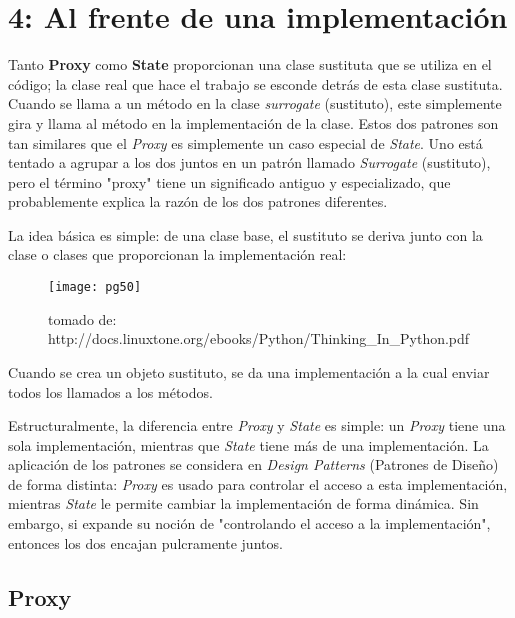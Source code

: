 \section*{4: Al frente de una implementación}
\label{sec:afdui}

Tanto \textbf{Proxy} como \textbf{State} proporcionan una clase sustituta que se utiliza en el código; la clase real que hace el trabajo se esconde detrás de esta clase sustituta. Cuando se llama a un método en la clase \textit{surrogate} (sustituto), este simplemente gira y llama al método en la implementación de la clase. Estos dos patrones son tan similares que el \textit{Proxy} es simplemente un caso especial de \textit{State}. Uno está tentado a agrupar a los dos juntos en un patrón llamado \textit{Surrogate} (sustituto), pero el término "proxy" tiene un significado antiguo y  especializado, que probablemente explica la razón de los dos patrones diferentes.    \newline

La idea básica es simple: de una clase base, el sustituto se deriva junto con la clase o clases que proporcionan la implementación real:

\begin{figure}[h]
    \centering
    \texttt{[image: pg50]} 
    \caption{tomado de: http://docs.linuxtone.org/ebooks/Python/Thinking\_In\_Python.pdf }
    \label{fig:mesh1}
\end{figure}

Cuando se crea un objeto sustituto, se da una implementación a la cual enviar todos los llamados a los métodos.    \newline

Estructuralmente, la diferencia entre \textit{Proxy} y \textit{State} es simple: un \textit{Proxy} tiene una sola implementación, mientras que \textit{State} tiene más de una implementación. La aplicación  de los patrones se considera en \textit{Design Patterns} (Patrones de Diseño) de forma distinta: \textit{Proxy} es usado para controlar el acceso a esta implementación, mientras \textit{State}  le permite cambiar la implementación de forma dinámica. Sin embargo, si expande su noción de "controlando el acceso a la implementación", entonces los dos encajan pulcramente juntos.

\subsection*{Proxy}
\label{subsec:Proxy}


